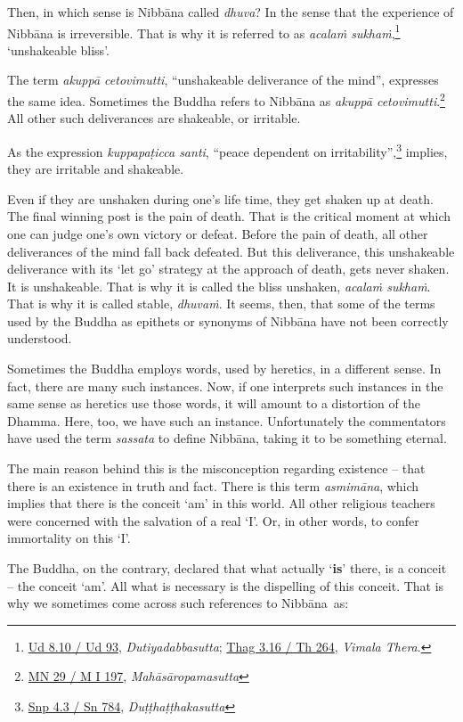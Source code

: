 Then, in which sense is Nibbāna called \emph{dhuva}? In the sense that the experience of Nibbāna is irreversible. That is why it is referred to as \emph{acalaṁ sukhaṁ},\footnote{\href{https://suttacentral.net/ud8.10/pli/ms}{Ud 8.10 / Ud 93}, \emph{Dutiyadabbasutta}; \href{https://suttacentral.net/thag3.16/pli/ms}{Thag 3.16 / Th 264}, \emph{Vimala Thera}.} `unshakeable bliss'.

The term \emph{akuppā cetovimutti}, ``unshakeable deliverance of the mind'', expresses the same idea. Sometimes the Buddha refers to Nibbāna as \emph{akuppā cetovimutti}.\footnote{\href{https://suttacentral.net/mn29/pli/ms}{MN 29 / M I 197}, \emph{Mahāsāropamasutta}} All other such deliverances are shakeable, or irritable.

As the expression \emph{kuppapaṭicca santi}, ``peace dependent on irritability'',\footnote{\href{https://suttacentral.net/snp4.3/pli/ms}{Snp 4.3 / Sn 784}, \emph{Duṭṭhaṭṭhakasutta}} implies, they are irritable and shakeable.

Even if they are unshaken during one's life time, they get shaken up at death. The final winning post is the pain of death. That is the critical moment at which one can judge one's own victory or defeat. Before the pain of death, all other deliverances of the mind fall back defeated. But this deliverance, this unshakeable deliverance with its `let go' strategy at the approach of death, gets never shaken. It is unshakeable. That is why it is called the bliss unshaken, \emph{acalaṁ sukhaṁ}. That is why it is called stable, \emph{dhuvaṁ}. It seems, then, that some of the terms used by the Buddha as epithets or synonyms of Nibbāna have not been correctly understood.

Sometimes the Buddha employs words, used by heretics, in a different sense. In fact, there are many such instances. Now, if one interprets such instances in the same sense as heretics use those words, it will amount to a distortion of the Dhamma. Here, too, we have such an instance. Unfortunately the commentators have used the term \emph{sassata} to define Nibbāna, taking it to be something eternal.

The main reason behind this is the misconception regarding existence -- that there is an existence in truth and fact. There is this term \emph{asmimāna}, which implies that there is the conceit `am' in this world. All other religious teachers were concerned with the salvation of a real `I'. Or, in other words, to confer immortality on this `I'.

The Buddha, on the contrary, declared that what actually `\textbf{is}' there, is a conceit -- the conceit `am'. All what is necessary is the dispelling of this conceit. That is why we sometimes come across such references to Nibbāna~as:

